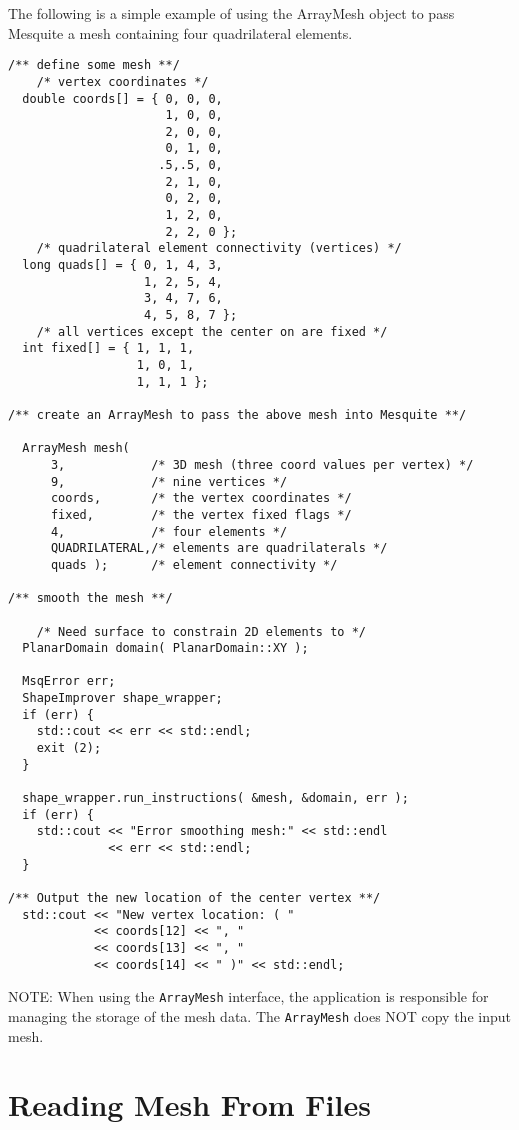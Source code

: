 The following is a simple example of using the ArrayMesh object to pass
Mesquite a mesh containing four quadrilateral elements.
\begin{lstlisting}
/** define some mesh **/
    /* vertex coordinates */
  double coords[] = { 0, 0, 0,
                      1, 0, 0,
                      2, 0, 0,
                      0, 1, 0,
                     .5,.5, 0,
                      2, 1, 0,
                      0, 2, 0,
                      1, 2, 0,
                      2, 2, 0 };
    /* quadrilateral element connectivity (vertices) */
  long quads[] = { 0, 1, 4, 3,
                   1, 2, 5, 4,
                   3, 4, 7, 6,
                   4, 5, 8, 7 };
    /* all vertices except the center on are fixed */
  int fixed[] = { 1, 1, 1,
                  1, 0, 1,
                  1, 1, 1 };
  
/** create an ArrayMesh to pass the above mesh into Mesquite **/
  
  ArrayMesh mesh( 
      3,            /* 3D mesh (three coord values per vertex) */
      9,            /* nine vertices */
      coords,       /* the vertex coordinates */ 
      fixed,        /* the vertex fixed flags */
      4,            /* four elements */
      QUADRILATERAL,/* elements are quadrilaterals */
      quads );      /* element connectivity */
  
/** smooth the mesh **/
  
    /* Need surface to constrain 2D elements to */
  PlanarDomain domain( PlanarDomain::XY );

  MsqError err;
  ShapeImprover shape_wrapper;
  if (err) {
    std::cout << err << std::endl;
    exit (2);
  }
  
  shape_wrapper.run_instructions( &mesh, &domain, err );
  if (err) {
    std::cout << "Error smoothing mesh:" << std::endl
              << err << std::endl;
  }
  
/** Output the new location of the center vertex **/
  std::cout << "New vertex location: ( "
            << coords[12] << ", " 
            << coords[13] << ", " 
            << coords[14] << " )" << std::endl;
\end{lstlisting}

NOTE:  When using the \texttt{ArrayMesh} interface, the application is responsible for managing the storage of the mesh data.  The \texttt{ArrayMesh}
 does NOT copy the input mesh.  

 
\section{Reading Mesh From Files} \label{sec:meshFiles}

